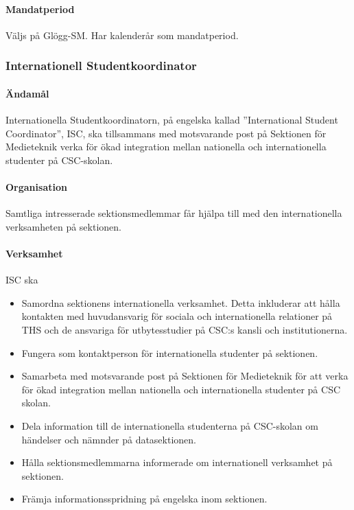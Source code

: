 \documentclass{dgovdoc}
\begin{document}
\paragraph{Mandatperiod}
Väljs på Glögg-SM. Har kalenderår som mandatperiod.

\subsubsection{Internationell Studentkoordinator}
\paragraph{Ändamål}

Internationella Studentkoordinatorn,
på engelska kallad ''International Student Coordinator'', ISC, ska tillsammans
med motsvarande post på Sektionen för Medieteknik verka för ökad integration
mellan nationella och internationella studenter på CSC-skolan.

\paragraph{Organisation}

Samtliga intresserade
sektionsmedlemmar får hjälpa till med den internationella verksamheten på sektionen.

\paragraph{Verksamhet}

ISC ska

\begin{itemize}
	\item Samordna sektionens internationella verksamhet. Detta
	inkluderar att hålla kontakten med huvudansvarig för sociala och internationella relationer
	på THS och de ansvariga för utbytesstudier på CSC:s kansli och institutionerna.
	\item Fungera som kontaktperson för internationella studenter på sektionen.
	\item Samarbeta med motsvarande post på Sektionen för Medieteknik för att verka för ökad integration mellan nationella och internationella studenter på CSC skolan.
	\item Dela information till de internationella studenterna på CSC-skolan om händelser och nämnder på datasektionen.
	\item Hålla sektionsmedlemmarna informerade om internationell verksamhet på sektionen.
	\item Främja informationsspridning på engelska inom sektionen.
\end{itemize}
\end{document}
